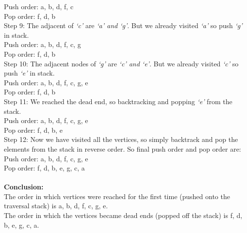 \documentclass{article}
\begin{document}
\indent \indent \indent Push order: a, b, d, f, c \\
\indent \indent \indent Pop order: f, d, b \\
Step 9: The adjacent of \textit{`c'} are \textit{`a' and `g'}. But we already visited \textit{`a'} so push \textit{`g'} in stack. \\
\indent \indent \indent Push order: a, b, d, f, c, g \\
\indent \indent \indent Pop order: f, d, b \\
Step 10: The adjacent nodes of \textit{`g'} are \textit{`c' and `e'}. But we already visited \textit{`c'} so push \textit{`e'} in stack. \\
\indent \indent \indent Push order: a, b, d, f, c, g, e \\
\indent \indent \indent Pop order: f, d, b \\
Step 11: We reached the dead end, so backtracking and popping \textit{`e'} from the stack. \\
\indent \indent \indent Push order: a, b, d, f, c, g, e \\
\indent \indent \indent Pop order: f, d, b, e \\
Step 12: Now we have visited all the vertices, so simply backtrack and pop the elements from the stack in reverse order. So final push order and pop order are:
\indent \indent \indent Push order: a, b, d, f, c, g, e \\
\indent \indent \indent Pop order: f, d, b, e, g, c, a \\ \\ 
\textbf{Conclusion:} \\
The order in which vertices were reached for the first time (pushed onto the traversal stack) is a, b, d, f, c, g, e.  \\
The order in which the vertices became dead ends (popped off the stack) is f, d, b, e, g, c, a.
\end{document}
